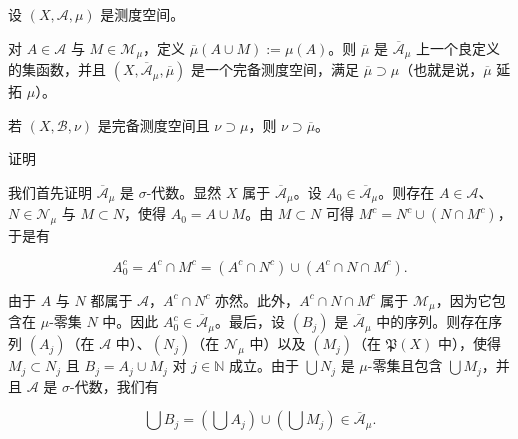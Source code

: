 \begin{proposition}

设 $ (X, \mathcal{A}, \mu) $ 是测度空间。

\begin{items}
\item

对 $ A \in \mathcal{A} $ 与 $ M \in \mathcal{M}_{\mu} $，定义 $ \overline{\mu}(A \cup M) := \mu(A) $。则 $ \overline{\mu} $ 是 $ \overline{\mathcal{A}}_{\mu} $ 上一个良定义的集函数，并且 $ (X, \overline{\mathcal{A}}_{\mu}, \overline{\mu}) $ 是一个完备测度空间，满足 $ \overline{\mu} \supset \mu $（也就是说，$ \overline{\mu} $ 延拓 $ \mu $）。

\item

若 $ (X, \mathcal{B}, \nu) $ 是完备测度空间且 $ \nu \supset \mu $，则 $ \nu \supset \overline{\mu} $。

\end{items}

证明

\begin{subitems}
\item

我们首先证明 $ \overline{\mathcal{A}}_{\mu} $ 是 $ \sigma $-代数。显然 $ X $ 属于 $ \overline{\mathcal{A}}_{\mu} $。设 $ A_{0} \in \overline{\mathcal{A}}_{\mu} $。则存在 $ A \in \mathcal{A} $、$ N \in \mathcal{N}_{\mu} $ 与 $ M \subset N $，使得 $ A_{0} = A \cup M $。由 $ M \subset N $ 可得 $ M^{c} = N^{c} \cup (N \cap M^{c}) $，于是有

\[
A_{0}^{c} = A^{c} \cap M^{c} = (A^{c} \cap N^{c}) \cup (A^{c} \cap N \cap M^{c}) .
\]

由于 $ A $ 与 $ N $ 都属于 $ \mathcal{A} $，$ A^{c} \cap N^{c} $ 亦然。此外，$ A^{c} \cap N \cap M^{c} $ 属于 $ \mathcal{M}_{\mu} $，因为它包含在 $ \mu $-零集 $ N $ 中。因此 $ A_{0}^{c} \in \overline{\mathcal{A}}_{\mu} $。最后，设 $ (B_{j}) $ 是 $ \overline{\mathcal{A}}_{\mu} $ 中的序列。则存在序列 $ (A_{j}) $（在 $ \mathcal{A} $ 中）、$ (N_{j}) $（在 $ \mathcal{N}_{\mu} $ 中）以及 $ (M_{j}) $（在 $ \mathfrak{P}(X) $ 中），使得 $ M_{j} \subset N_{j} $ 且 $ B_{j} = A_{j} \cup M_{j} $ 对 $ j \in \mathbb{N} $ 成立。由于 $ \bigcup N_{j} $ 是 $ \mu $-零集且包含 $ \bigcup M_{j} $，并且 $ \mathcal{A} $ 是 $ \sigma $-代数，我们有

\[
\bigcup B_{j} = \left(\bigcup A_{j}\right) \cup \left(\bigcup M_{j}\right) \in \overline{\mathcal{A}}_{\mu} .
\]
\item


\end{subitems}
\end{proposition}
